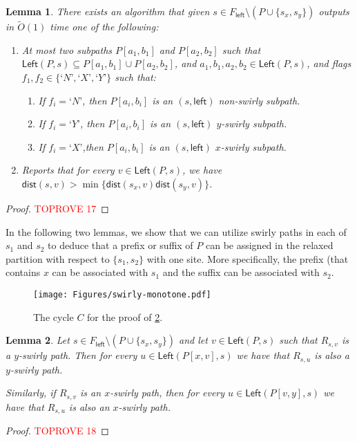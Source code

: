 \documentclass{article}
\newcommand{\Left}{\mathsf{Left}}
\newcommand{\leftside}{\mathsf{left}}
\newcommand{\dist}{\mathsf{dist}}
\newtheorem{lemma}{Lemma}
\newcommand{\Otild}{\tilde{O}}
\begin{document}
\begin{lemma}\label{lem:Partition-P-for-one-site}
    There exists an algorithm that given $s\in F_{\leftside}\setminus (P\cup\{s_x,s_y\})$ outputs in $\Otild(1)$ time one of the following:
    \begin{enumerate}
        \item At most two subpaths $P[a_1,b_1]$ and $P[a_2,b_2]$ such that $\Left(P,s)\subseteq P[a_1,b_1] \cup P[a_2,b_2]$, and $a_1,b_1,a_2,b_2\in\Left(P,s)$, and flags $f_1,f_2 \in \{‘N’,‘X’,‘Y’\} $ such that:
        \begin{enumerate}
        \item If $f_i=‘N’$, then $P[a_i,b_i]$ is an $(s,\leftside)$ non-swirly subpath.
        \item If $f_i=‘Y’$, then $P[a_i,b_i]$ is an $(s,\leftside)$ $y$-swirly subpath.
        \item If $f_i=‘X’$,then $P[a_i,b_i]$ is an $(s,\leftside)$ $x$-swirly subpath.
    \end{enumerate}
        \item Reports that for every $v\in \Left(P,s)$, we have $\dist(s,v)>\min\{\dist(s_x,v)\dist(s_y,v)\}$.
    \end{enumerate}
\end{lemma}
\begin{proof}\textcolor{red}{TOPROVE 17}\end{proof}
In the following two lemmas, we show that we can utilize swirly paths in each of $s_1$ and $s_2$ to deduce that a prefix or suffix of $P$ can be assigned in the relaxed partition with respect to $\{s_1,s_2\}$ with one site.
More specifically, the prefix (that contains $x$ can be associated with $s_1$ and the suffix can be associated with $s_2$.
\begin{figure}[ht]
    \centering
    \texttt{[image: Figures/swirly-monotone.pdf]}
    \caption{The cycle $C$ for the proof of \cref{lem:swirly-monotone}.}
    \label{fig:swirly-monotone}
\end{figure}
\begin{lemma}\label{lem:swirly-monotone}
    Let $s\in F_{\leftside}\setminus (P\cup \{s_x,s_y\})$ and let $v\in \Left(P,s)$ such that $R_{s,v}$ is a $y$-swirly path.
    Then for every $u\in \Left(P[x,v],s)$ we have that $R_{s,u}$ is also a $y$-swirly path.

    Similarly, if $R_{s,v}$ is an $x$-swirly path, then for every $u\in \Left(P[v,y],s)$ we have that $R_{s,u}$ is also an $x$-swirly path.
\end{lemma}
\begin{proof}\textcolor{red}{TOPROVE 18}\end{proof}
\end{document}
